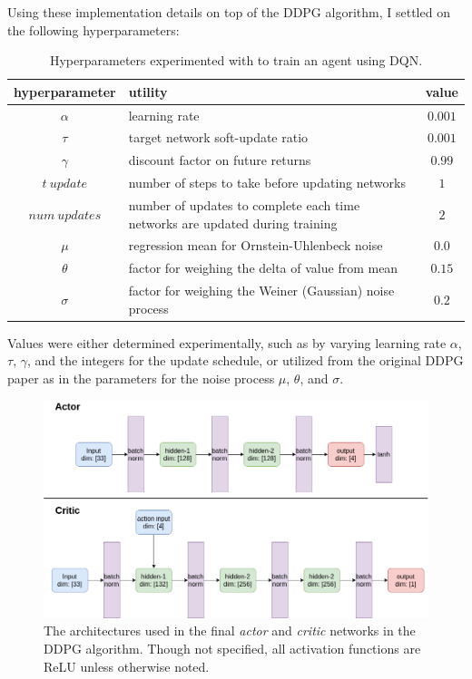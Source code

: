 \documentclass[11pt]{article}
\begin{document}
 \FloatBarrier
 
 Using these implementation details on top of the DDPG algorithm, I settled on the following hyperparameters:
 
 \FloatBarrier
 
 \begin{table}[!ht]
 	\centering
 	\begin{tabular}{ c | p{6cm} | c }
 		\textbf{hyperparameter} & \textbf{utility} & \textbf{value} \\
 		\hline
 		$\alpha$ & learning rate & $0.001$ \\
 		$\tau$ & target network soft-update ratio & $0.001$ \\
 		$\gamma$ & discount factor on future returns & $0.99$ \\
 		$t\ update$ & number of steps to take before updating networks & $1$ \\
 		$num\ updates$ & number of updates to complete each time networks are updated during training & $2$ \\
 		$\mu$ & regression mean for Ornstein-Uhlenbeck noise & $0.0$ \\
 		$\theta$ & factor for weighing the delta of value from mean & $0.15$ \\
 		$\sigma$ & factor for weighing the Weiner (Gaussian) noise process & $0.2$ \\
 		\hline
 	\end{tabular}
 	\caption{Hyperparameters experimented with to train an agent using DQN.}
 	\label{tbl:parameters}
 \end{table}
 
 Values were either determined experimentally, such as by varying learning rate $\alpha$, $\tau$, $\gamma$, and the integers for the update schedule, or utilized from the original DDPG paper \cite{ddpg} as in the parameters for the noise process $\mu$, $\theta$, and $\sigma$.
 
  \FloatBarrier
  
  \begin{figure}[!ht]
 	\centering
 	\includegraphics[width=0.8\linewidth]{images/architectures.png}
 	\caption{The architectures used in the final \textit{actor} and \textit{critic} networks in the DDPG algorithm. Though not specified, all activation functions are ReLU unless otherwise noted.}
 	\label{fig:nn-architecture}
 \end{figure}
 
\end{document}
